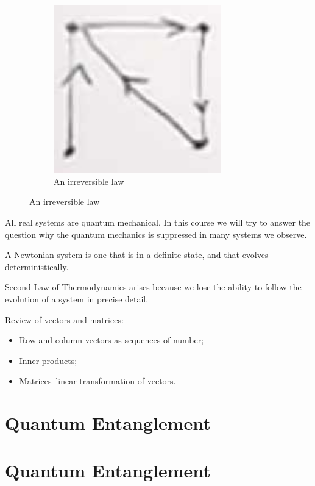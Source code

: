 \documentclass[]{article}
\begin{document}
\begin{figure}[H]
\begin{subfigure}[t]{0.5\textwidth}
	\end{subfigure}
	\begin{subfigure}[t]{0.5\textwidth}
		\caption{An irreversible law}
		\includegraphics[width=0.8\textwidth]{et-1-2}
	\end{subfigure}
\end{figure}

All real systems are quantum mechanical. In this course we will try to answer the question why the quantum mechanics is suppressed in many systems we observe.

A Newtonian system is one that is in a definite state, and that evolves deterministically.

Second Law of Thermodynamics arises because we lose the ability to follow the evolution of a system in precise detail.

Review of vectors and matrices:
\begin{itemize}
	\item Row and column vectors as sequences of number;
	\item Inner products;
	\item Matrices--linear transformation of vectors.
\end{itemize}
\section{Quantum Entanglement}
\section{Quantum Entanglement}
\end{document}
